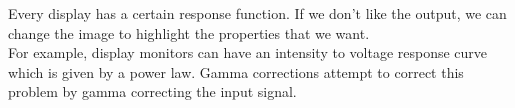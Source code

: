 Every display has a certain response function. If we don't like the output, we can change the image to highlight the properties that we want. \\
For example, display monitors can have an intensity to voltage response curve which is given by a power law. Gamma corrections attempt to correct this problem by gamma correcting the input signal.
